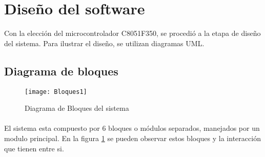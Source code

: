 \section{Dise\~no del software} %
\label{sec:diseno_del_software}


Con la elecci\'on del microcontrolador C8051F350, se procedi\'o a la etapa de dise\~no del sistema. Para ilustrar el dise\~no, se utilizan diagramas UML.

\subsection{Diagrama de bloques} %
\label{sub:diagrama_de_bloques}

\begin{figure}[h]
  \centering
  \texttt{[image: Bloques1]}
  \caption{Diagrama de Bloques del sistema}\label{fig:bloques1}
\end{figure}

\paragraph{}
El sistema esta compuesto por 6 bloques o m\'odulos separados, manejados por un modulo principal. En la figura \ref{fig:bloques1} se pueden observar estos bloques y la interacci\'on que tienen entre si. 
\paragraph{}


